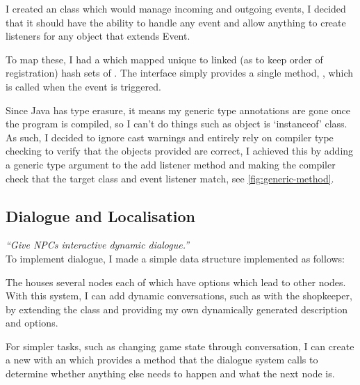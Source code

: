 \documentclass{article}
\begin{document}
\begin{multicols}{2}
                    I created an  class which would manage incoming and outgoing events, I decided that it should have the ability to handle any event and allow anything to create listeners for any object that extends Event.

                    To map these, I had a  which mapped unique  to linked (as to keep order of registration) hash sets of . The interface simply provides a single method, , which is called when the event is triggered.

                    Since Java has type erasure, it means my generic type annotations are gone once the program is compiled, so I can't do things such as object is `instanceof' class. As such, I decided to ignore cast warnings and entirely rely on compiler type checking to verify that the objects provided are correct, I achieved this by adding a generic type argument to the add listener method and making the compiler check that the target class and event listener match, see \autoref{fig:generic-method}.

                \subsection{Dialogue and Localisation}
                \textit{``Give NPCs interactive dynamic dialogue.''} \\

                    To implement dialogue, I made a simple data structure implemented as follows:


                    The  houses several nodes each of which have options which lead to other nodes. With this system, I can add dynamic conversations, such as with the shopkeeper, by extending the  class and providing my own dynamically generated description and options.

                    For simpler tasks, such as changing game state through conversation, I can create a new  with an  which provides a method that the dialogue system calls to determine whether anything else needs to happen and what the next node is.


\end{multicols}
\end{document}
